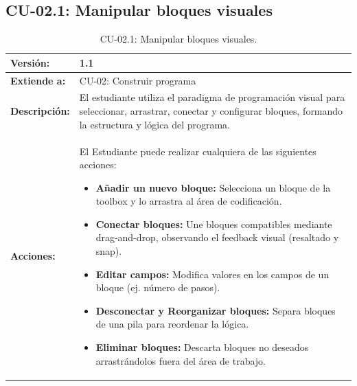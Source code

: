 \subsection{CU-02.1: Manipular bloques visuales}
\begin{table}[H]

	\centering
	\begin{tabularx}{\linewidth}{|p{3cm}|X|}
		\hline
		\textbf{Versión:} & 1.1 \\ \hline
		\textbf{Extiende a:} & CU-02: Construir programa \\ \hline
		\textbf{Descripción:} & El estudiante utiliza el paradigma de programación visual para seleccionar, arrastrar, conectar y configurar bloques, formando la estructura y lógica del programa. \\ \hline
		\textbf{Acciones:} & 
		El Estudiante puede realizar cualquiera de las siguientes acciones:
		\begin{itemize}
			\item \textbf{Añadir un nuevo bloque:} Selecciona un bloque de la toolbox y lo arrastra al área de codificación.
			\item \textbf{Conectar bloques:} Une bloques compatibles mediante drag-and-drop, observando el feedback visual (resaltado y snap).
			\item \textbf{Editar campos:} Modifica valores en los campos de un bloque (ej. número de pasos).
			\item \textbf{Desconectar y Reorganizar bloques:} Separa bloques de una pila para reordenar la lógica.
			\item \textbf{Eliminar bloques:} Descarta bloques no deseados arrastrándolos fuera del área de trabajo.
		\end{itemize} \\ \hline
	\end{tabularx}
	\caption{CU-02.1: Manipular bloques visuales.}
\end{table}

